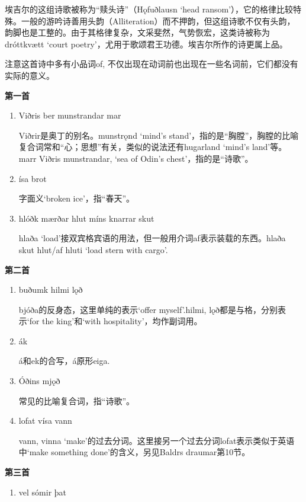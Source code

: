 \begin{grammar*}{}
  埃吉尔的这组诗歌被称为“赎头诗”（Hǫfuðlausn `head ransom'），它的格律比较特殊。一般的游吟诗善用头韵（Alliteration）而不押韵，但这组诗歌不仅有头韵，韵脚也是工整的。由于其格律复杂，文采斐然，气势恢宏，这类诗被称为 dróttkvætt `court poetry'，尤用于歌颂君王功德。埃吉尔所作的诗更属上品。

  注意这首诗中多有小品词of, 不仅出现在动词前也出现在一些名词前，它们都没有实际的意义。

  \textbf{第一首}
  \begin{enumerate}[leftmargin=*]
    \item Viðris ber munstrandar mar

          Viðrir是奥丁的别名。munstrǫnd `mind's stand'，指的是“胸膛”，胸膛的比喻复合词常和“心；思想”有关，类似的说法还有hugarland `mind's land'等。marr Viðris munstrandar, `sea of Odin's chest'，指的是“诗歌”。

    \item ísa brot

          字面义`broken ice'，指“春天”。

    \item hlóðk mærðar hlut míns knarrar skut

          hlaða `load'接双宾格宾语的用法，但一般用介词af表示装载的东西。hlaða skut hlut/af hluti `load stern with cargo'.

  \end{enumerate}
  \textbf{第二首}
  \begin{enumerate}[leftmargin=*]
    \item buðumk hilmi lǫð

          bjóða的反身态，这里单纯的表示`offer myself'.hilmi, lǫð都是与格，分别表示`for the king'和`with hospitality'，均作副词用。

    \item ák

          á和ek的合写，á原形eiga.

    \item Óðins mjǫð

          常见的比喻复合词，指“诗歌”。

    \item lofat vísa vann

          vann, vinna `make'的过去分词。这里接另一个过去分词lofat表示类似于英语中`make something done'的含义，另见Baldrs draumar第10节。
  \end{enumerate}
  \textbf{第三首}
  \begin{enumerate}[leftmargin=*]
    \item vel sómir þat


\end{enumerate}
\end{grammar*}
